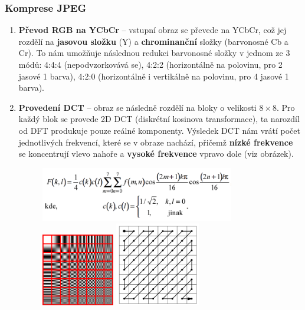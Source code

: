 \subsubsection{Komprese JPEG}
\begin{enumerate}
	\item \textbf{Převod RGB na YCbCr} -- vstupní obraz se převede na YCbCr, což jej rozdělí na \textbf{jasovou složku} (Y) a \textbf{chrominanční} složky (barvonosné Cb a Cr). To nám umožňuje následnou redukci barvonosné složky v jednom ze 3 módů: 4:4:4 (nepodvzorkovává se), 4:2:2 (horizontálně na polovinu, pro 2 jasové 1 barva), 4:2:0 (horizontálně i vertikálně na polovinu, pro 4 jasové 1 barva).
	\item \textbf{Provedení DCT} -- obraz se následně rozdělí na bloky o velikosti $8 \times 8$. Pro každý blok se provede 2D DCT (diskrétní kosinova transformace), ta narozdíl od DFT produkuje pouze reálné komponenty. Výsledek DCT nám vrátí počet jednotlivých frekvencí, které se v obraze nachází, přičemž \textbf{nízké frekvence} se koncentrují vlevo nahoře a \textbf{vysoké frekvence} vpravo dole (viz obrázek).
	\begin{figure}[H]
		\centering
		\includegraphics[width=0.8\textwidth]{assets/7_dct1}
		\includegraphics[width=0.3\textwidth]{assets/7_dct2}
		\includegraphics[width=0.35\textwidth]{assets/7_jpeg_zigzag}

\end{figure}
\end{enumerate}
